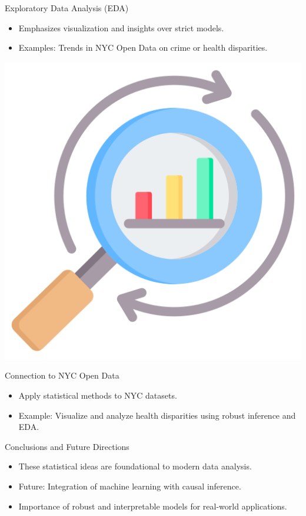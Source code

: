 \documentclass{beamer}
\begin{document}
\begin{frame}{Exploratory Data Analysis (EDA)}
\begin{itemize}
    \item Emphasizes visualization and insights over strict models.
    \item Examples: Trends in NYC Open Data on crime or health disparities.
\end{itemize}

\includegraphics[width=\textwidth]{example-plot.png} %
\end{frame}

\begin{frame}{Connection to NYC Open Data}
\begin{itemize}
    \item Apply statistical methods to NYC datasets.
    \item Example: Visualize and analyze health disparities using robust inference and EDA.
\end{itemize}
\end{frame}

\begin{frame}{Conclusions and Future Directions}
\begin{itemize}
    \item These statistical ideas are foundational to modern data analysis.
    \item Future: Integration of machine learning with causal inference.
    \item Importance of robust and interpretable models for real-world applications.
\end{itemize}
\end{frame}
\end{document}
